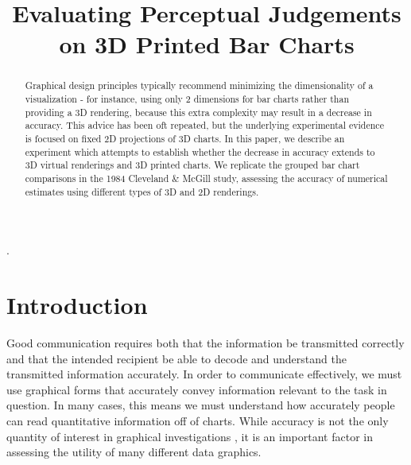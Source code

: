 \documentclass[letterpaper,inpress,dvipsnames]{jdsart}
\begin{document}
\begin{frontmatter}

\title{Evaluating Perceptual Judgements on 3D Printed Bar Charts}

\author[1]{
      }
\author[1]{
    }

\address[1]{Department of Statistics, 
  , }

\begin{abstract}
Graphical design principles typically recommend minimizing the dimensionality of a visualization - for instance, using only 2 dimensions for bar charts rather than providing a 3D rendering, because this extra complexity may result in a decrease in accuracy. This advice has been oft repeated, but the underlying experimental evidence is focused on fixed 2D projections of 3D charts. In this paper, we describe an experiment which attempts to establish whether the decrease in accuracy extends to 3D virtual renderings and 3D printed charts. We replicate the grouped bar chart comparisons in the 1984 Cleveland \& McGill study, assessing the accuracy of numerical estimates using different types of 3D and 2D renderings.
\end{abstract}

\begin{keywords}
.
\end{keywords}

\end{frontmatter}

\hypertarget{introduction}{%
\section{Introduction}\label{introduction}}

Good communication requires both that the information be transmitted correctly and that the intended recipient be able to decode and understand the transmitted information accurately. In order to communicate effectively, we must use graphical forms that accurately convey information relevant to the task in question. In many cases, this means we must understand how accurately people can read quantitative information off of charts. While accuracy is not the only quantity of interest in graphical investigations \citep{hullmanPursuitErrorSurvey2019}, it is an important factor in assessing the utility of many different data graphics.
\end{document}
